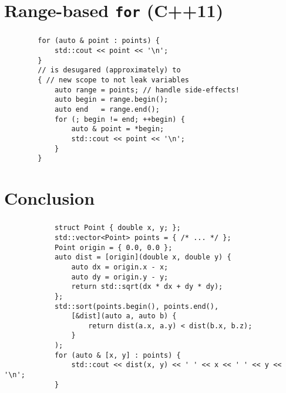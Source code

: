 \documentclass[aspectratio=43, t]{beamer}
\begin{document}
\section*{Range-based \texorpdfstring{\texttt{for}}{for} (C++11)}
\begin{frame}[fragile]
	\frametitle{\secname\footnotemark[1]{}}

	\begin{verbatim}
		for (auto & point : points) {
			std::cout << point << '\n';
		}
		// is desugared (approximately) to
		{ // new scope to not leak variables
			auto range = points; // handle side-effects!
			auto begin = range.begin();
			auto end   = range.end();
			for (; begin != end; ++begin) {
				auto & point = *begin;
				std::cout << point << '\n';
			}
		}
	\end{verbatim}
\end{frame}

\section*{Conclusion}
\begin{frame}[fragile]
	\frametitle{\secname}

	{\small
		\begin{verbatim}
			struct Point { double x, y; };
			std::vector<Point> points = { /* ... */ };
			Point origin = { 0.0, 0.0 };
			auto dist = [origin](double x, double y) {
				auto dx = origin.x - x;
				auto dy = origin.y - y;
				return std::sqrt(dx * dx + dy * dy);
			};
			std::sort(points.begin(), points.end(),
				[&dist](auto a, auto b) {
					return dist(a.x, a.y) < dist(b.x, b.z);
				}
			);
			for (auto & [x, y] : points) {
				std::cout << dist(x, y) << ' ' << x << ' ' << y << '\n';
			}
		\end{verbatim}
	}
\end{frame}

\end{document}
